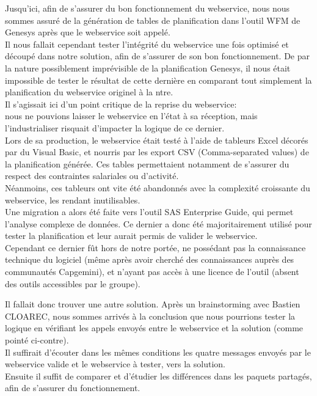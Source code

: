 \documentclass{rapport}
\begin{document}
Jusqu'ici, afin de s'assurer du bon fonctionnement du webservice, nous nous sommes assuré de la génération de tables de planification dans l'outil WFM de Genesys après que le webservice soit appelé.\\
Il nous fallait cependant tester l'intégrité du webservice une fois optimisé et découpé dans notre solution, afin de s'assurer de son bon fonctionnement. De par la nature possiblement imprévisible de la planification Genesys, il nous était impossible de tester le résultat de cette dernière en comparant tout simplement la planification du webservice originel à la ntre.\\

Il s'agissait ici d'un point critique de la reprise du webservice:\\
nous ne pouvions laisser le webservice en l'état à sa réception, mais l'industrialiser risquait d'impacter la logique de ce dernier.\\

Lors de sa production, le webservice était testé à l'aide de tableurs Excel décorés par du Visual Basic, et nourris par les export CSV (Comma-separated values) de la planification générée. Ces tables permettaient notamment de s'assurer du respect des contraintes salariales ou d'activité.\\
Néanmoins, ces tableurs ont vite été abandonnés avec la complexité croissante du webservice, les rendant inutilisables.\\
Une migration a alors été faite vers l'outil SAS Enterprise Guide, qui permet l'analyse complexe de données. Ce dernier a donc été majoritairement utilisé pour tester la planification et leur aurait permis de valider le webservice.\\
Cependant ce dernier fût hors de notre portée, ne possédant pas la connaissance technique du logiciel (même après avoir cherché des connaissances auprès des communautés Capgemini), et n'ayant pas accès à une licence de l'outil (absent des outils accessibles par le groupe).\\

\begin{minipage}{0.35\textwidth}
Il fallait donc trouver une autre solution. Après un brainstorming avec Bastien CLOAREC, nous sommes arrivés à la conclusion que nous pourrions tester la logique en vérifiant les appels envoyés entre le webservice et la solution (comme pointé ci-contre).\\

Il suffirait d'écouter dans les mêmes conditions les quatre messages envoyés par le webservice valide et le webservice à tester, vers la solution.\\
Ensuite il suffit de comparer et d'étudier les différences dans les paquets partagés, afin de s'assurer du fonctionnement.\\
\end{minipage}
\begin{minipage}{0.55\textwidth}
\end{minipage}
\vspace{5mm} %
\\
\end{document}
